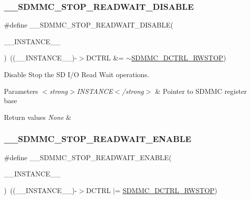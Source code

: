 \subsubsection{\texorpdfstring{\_\_SDMMC\_STOP\_READWAIT\_DISABLE}{\_\_SDMMC\_STOP\_READWAIT\_DISABLE}}
{\footnotesize\ttfamily \#define \+\_\+\+\_\+\+S\+D\+M\+M\+C\+\_\+\+S\+T\+O\+P\+\_\+\+R\+E\+A\+D\+W\+A\+I\+T\+\_\+\+D\+I\+S\+A\+B\+LE(\begin{DoxyParamCaption}\item[{}]{\+\_\+\+\_\+\+I\+N\+S\+T\+A\+N\+C\+E\+\_\+\+\_\+ }\end{DoxyParamCaption})~((\+\_\+\+\_\+\+I\+N\+S\+T\+A\+N\+C\+E\+\_\+\+\_\+)-\/$>$D\+C\+T\+RL \&= $\sim$\mbox{\hyperlink{group___peripheral___registers___bits___definition_ga68b631bb91b55ad41472640bff5e2d34}{S\+D\+M\+M\+C\+\_\+\+D\+C\+T\+R\+L\+\_\+\+R\+W\+S\+T\+OP}})}



Disable Stop the SD I/O Read Wait operations. 


\begin{DoxyParams}{Parameters}
{\em $<$strong$>$\+I\+N\+S\+T\+A\+N\+C\+E$<$/strong$>$} & Pointer to S\+D\+M\+MC register base\\
\hline
\end{DoxyParams}

\begin{DoxyRetVals}{Return values}
{\em None} & \\
\hline
\end{DoxyRetVals}
\mbox{\label{group___s_d_m_m_c___l_l___interrupt___clock_ga1ef11b32dd9c3243b229a621fe6c0617}} 
\subsubsection{\texorpdfstring{\_\_SDMMC\_STOP\_READWAIT\_ENABLE}{\_\_SDMMC\_STOP\_READWAIT\_ENABLE}}
{\footnotesize\ttfamily \#define \+\_\+\+\_\+\+S\+D\+M\+M\+C\+\_\+\+S\+T\+O\+P\+\_\+\+R\+E\+A\+D\+W\+A\+I\+T\+\_\+\+E\+N\+A\+B\+LE(\begin{DoxyParamCaption}\item[{}]{\+\_\+\+\_\+\+I\+N\+S\+T\+A\+N\+C\+E\+\_\+\+\_\+ }\end{DoxyParamCaption})~((\+\_\+\+\_\+\+I\+N\+S\+T\+A\+N\+C\+E\+\_\+\+\_\+)-\/$>$D\+C\+T\+RL $\vert$= \mbox{\hyperlink{group___peripheral___registers___bits___definition_ga68b631bb91b55ad41472640bff5e2d34}{S\+D\+M\+M\+C\+\_\+\+D\+C\+T\+R\+L\+\_\+\+R\+W\+S\+T\+OP}})}



